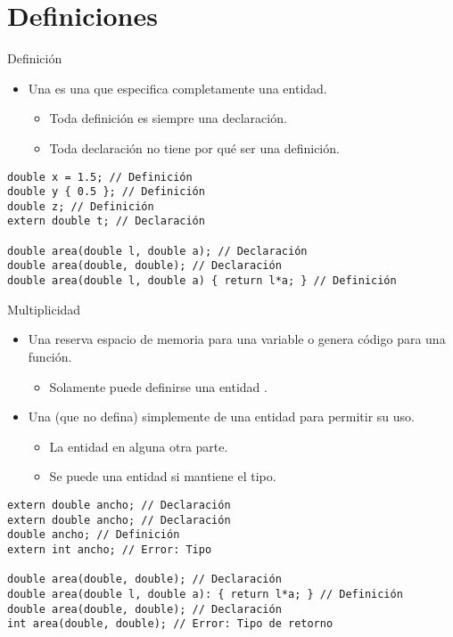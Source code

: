 \section{Definiciones}

\begin{frame}[t,fragile]{Definición}
  \begin{itemize}
    \item Una  es una 
           que especifica completamente una entidad.
      \begin{itemize}
        \item Toda definición es siempre una declaración.
        \item Toda declaración no tiene por qué ser una definición.
      \end{itemize}
  \end{itemize}
\begin{lstlisting}
double x = 1.5; // Definición
double y { 0.5 }; // Definición
double z; // Definición
extern double t; // Declaración

double area(double l, double a); // Declaración
double area(double, double); // Declaración
double area(double l, double a) { return l*a; } // Definición
\end{lstlisting}
\end{frame}

\begin{frame}[t,fragile]{Multiplicidad}
\begin{itemize}
  \item Una  reserva espacio de memoria 
        para una variable o genera código para una función.
    \begin{itemize}
      \item Solamente puede definirse una entidad .
    \end{itemize}
  \item Una  (que no defina) 
        simplemente  
        de una entidad para permitir su uso.
    \begin{itemize}
      \item La entidad  en alguna otra parte.
      \item Se puede  una entidad  
            si mantiene el tipo.
    \end{itemize}
\end{itemize}
\begin{lstlisting}
extern double ancho; // Declaración
extern double ancho; // Declaración
double ancho; // Definición
extern int ancho; // Error: Tipo

double area(double, double); // Declaración
double area(double l, double a): { return l*a; } // Definición
double area(double, double); // Declaración
int area(double, double); // Error: Tipo de retorno
\end{lstlisting}
\end{frame}
